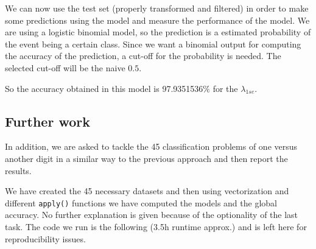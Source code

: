 \documentclass[
  10pt,
]{article}
\newenvironment{Shaded}{\begin{snugshade}}{\end{snugshade}}
\newcommand{\AttributeTok}[1]{\textcolor[rgb]{0.13,0.29,0.53}{#1}}
\newcommand{\CommentTok}[1]{\textcolor[rgb]{0.56,0.35,0.01}{\textit{#1}}}
\newcommand{\DecValTok}[1]{\textcolor[rgb]{0.00,0.00,0.81}{#1}}
\newcommand{\FloatTok}[1]{\textcolor[rgb]{0.00,0.00,0.81}{#1}}
\newcommand{\FunctionTok}[1]{\textcolor[rgb]{0.13,0.29,0.53}{\textbf{#1}}}
\newcommand{\NormalTok}[1]{#1}
\newcommand{\OtherTok}[1]{\textcolor[rgb]{0.56,0.35,0.01}{#1}}
\newcommand{\SpecialCharTok}[1]{\textcolor[rgb]{0.81,0.36,0.00}{\textbf{#1}}}
\newcommand{\StringTok}[1]{\textcolor[rgb]{0.31,0.60,0.02}{#1}}
\begin{document}
We can now use the test set (properly transformed and filtered) in order
to make some predictions using the model and measure the performance of
the model. We are using a logistic binomial model, so the prediction is
a estimated probability of the event being a certain class. Since we
want a binomial output for computing the accuracy of the prediction, a
cut-off for the probability is needed. The selected cut-off will be the
naive \(0.5\).

\begin{Shaded}
\end{Shaded}

So the accuracy obtained in this model is 97.9351536\(\%\) for the
\(\lambda_{1se}\).

\hypertarget{further-work}{%
\subsection{Further work}\label{further-work}}

In addition, we are asked to tackle the 45 classification problems of
one versus another digit in a similar way to the previous approach and
then report the results.

We have created the 45 necessary datasets and then using vectorization
and different \texttt{apply()} functions we have computed the models and
the global accuracy. No further explanation is given because of the
optionality of the last task. The code we run is the following (3.5h
runtime approx.) and is left here for reproducibility issues.
\end{document}
